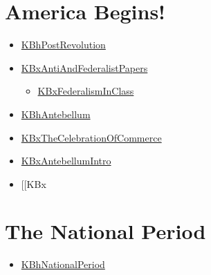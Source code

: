 \documentclass[letterpaper]{article}
\begin{document}
\section{America Begins!}
\label{sec:orga4808e7}
\begin{itemize}
\item \href{KBhPostRevolution.org}{KBhPostRevolution}
\item \href{KBxAntiAndFederalistPapers.org}{KBxAntiAndFederalistPapers}

\begin{itemize}
\item \href{KBxFederalismInClass.org}{KBxFederalismInClass}
\end{itemize}

\item \href{KBhAntebellum.org}{KBhAntebellum}
\item \href{KBxTheCelebrationOfCommerce.org}{KBxTheCelebrationOfCommerce}
\item \href{KBxAntebellumIntro.org}{KBxAntebellumIntro}
\item\relax [[KBx
\end{itemize}

\section{The National Period}
\label{sec:orgfe73efe}
\begin{itemize}
\item \href{KBhNationalPeriod.org}{KBhNationalPeriod}
\end{itemize}
\end{document}
